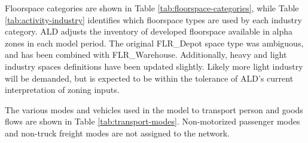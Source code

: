 Floorspace categories are shown in Table \ref{tab:floorspace-categories}, while Table \ref{tab:activity-industry} identifies which floorspace types are used by each industry category. ALD adjusts the inventory of developed floorspace available in alpha zones in each model period. The original FLR\_Depot space type was ambiguous, and has been combined with FLR\_Warehouse. Additionally, heavy and light industry spaces definitions have been updated slightly. Likely more light industry will be demanded, but is expected to be within the tolerance of ALD's current interpretation of zoning inputs.   


The various modes and vehicles used in the model to transport person and goods flows are shown in Table \ref{tab:transport-modes}. Non-motorized passenger modes and non-truck freight modes are not assigned to the network.

 

